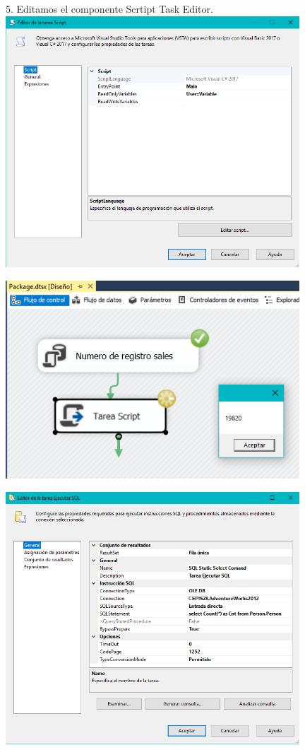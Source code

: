\begin{itemize}
\begin{center}
\item 5. Editamos el componente Scrtipt Task Editor.\\
	\includegraphics[width=11cm]{./Imagenes/img21}
	\end{center}	
	\begin{center}
	\includegraphics[width=11cm]{./Imagenes/img22}
	\end{center}	
	\begin{center}
	\includegraphics[width=11cm]{./Imagenes/img23}

\end{center}
\end{itemize}
